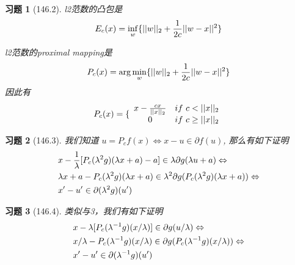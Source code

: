 \documentclass[a4paper, UTF8]{ctexart}
\newtheorem*{exercise}{\textbf{习题}}
\begin{document}
	\begin{exercise}[146.2]
		l2范数的凸包是
		\begin{equation}
		\notag
		\begin{split}
		E_c(x) = \inf_w \{||w||_2 + \frac{1}{2c}||w - x||^2\}
		\end{split}
		\end{equation}

		l2范数的proximal mapping是 
		\begin{equation}
		\notag
		\begin{split}
		P_c(x) = \arg \min_w \{||w||_2 + \frac{1}{2c}||w - x||^2\}
		\end{split}
		\end{equation}
		因此有
		\begin{equation}
		\notag
		\begin{split}
		P_c(x) = \{
		\begin{array}{cc}
		x - \frac{cx}{||x||_2} & if \ c < ||x||_2 \\
		0 & if \ c \ge ||x||_2
		\end{array}
		\end{split}
		\end{equation}

	\end{exercise}

	\begin{exercise}[146.3]
		我们知道 $u = P_cf(x) \Leftrightarrow x - u \in \partial f(u)$, 那么有如下证明
		\begin{equation}
		\notag
		\begin{split}
		& x - \frac{1}{\lambda}[P_c(\lambda^2 g)(\lambda x + a) - a] \in \lambda \partial g(\lambda u + a) \Leftrightarrow \\
		& \lambda x + a - P_c(\lambda^2 g)(\lambda x + a) \in \lambda^2 \partial g(P_c(\lambda^2 g)(\lambda x + a)) \Leftrightarrow \\
		& x' - u' \in \partial (\lambda^2 g)(u')
		\end{split}
		\end{equation}
	\end{exercise}

	\begin{exercise}[146.4]
		类似与3，我们有如下证明
		\begin{equation}
		\notag
		\begin{split}
		& x - {\lambda}[P_c(\lambda^{-1} g)(x / \lambda)] \in \partial g(u / \lambda) \Leftrightarrow \\
		& x / \lambda - P_c(\lambda^{-1} g)(x / \lambda) \in \partial g(P_c(\lambda^{-1} g)(x / \lambda)) \Leftrightarrow \\
		& x' - u' \in \partial (\lambda^{-1} g)(u')
		\end{split}
		\end{equation}
	\end{exercise}
\end{document}
